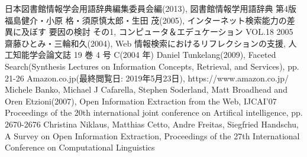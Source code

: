 \documentclass[a4j,11pt, twocolumn]{jarticle}
\begin{document}
\begin{thebibliography}{9}
  日本図書館情報学会用語辞典編集委員会編(2013), 図書館情報学用語辞典 第4版
   福島健介・小原 格・須原慎太郎・生田 茂(2005), インターネット検索能力の差異に及ぼす 要因の検討 その1, コンピュータ＆エデュケーション VOL.18 2005
   齋藤ひとみ・三輪和久(2004),  Web 情報検索におけるリフレクションの支援, 人工知能学会論文誌 19 巻 4 号 C(2004 年)
  Daniel Tunkelang(2009), Faceted Search(Synthesis Lectures on Information Concepts, Retrieval, and Services), pp. 21-26
  Amazon.co.jp(最終閲覧日: 2019年5月23日), https://www.amazon.co.jp/
  Michele Banko, Michael J Cafarella, Stephen Soderland, Matt Broadhead and Oren Etzioni(2007), Open Information Extraction from the Web, IJCAI'07 Proceedings of the 20th international joint conference on Artifical intelligence, pp. 2670-2676 
  Christina Niklaus, Matthias Cetto, Andre Freitas, Siegfried Handschu, A Survey on Open Information Extraction, Proceedings of the 27th International Conference on Computational Linguistics
\end{thebibliography}
\end{document}
